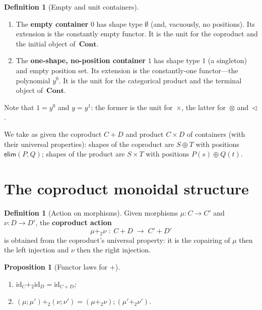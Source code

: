 \documentclass[11pt,a4paper]{article}
\theoremstyle{plain}
\newtheorem{proposition}[theorem]{Proposition}
\theoremstyle{definition}
\newtheorem{definition}[theorem]{Definition}
\newcommand{\id}{\mathrm{id}}
\newcommand{\Cont}{\mathbf{Cont}}
\newcommand{\seq}{\mathbin{\triangleleft}}
\begin{document}
\begin{definition}[Empty and unit containers]\label{def:zero-one}
\begin{enumerate}
  \item The \textbf{empty container} $0$ has shape type $\emptyset$
        (and, vacuously, no positions). Its extension is the constantly
        empty functor. It is the unit for the coproduct and the initial
        object of~$\Cont$.
  \item The \textbf{one-shape, no-position container} $1$ has shape type
        $1$ (a singleton) and empty position set. Its extension is the
        constantly-one functor---the polynomial $y^0$. It is the unit for
        the categorical product and the terminal object of~$\Cont$.
\end{enumerate}
Note that $1 = y^0$ and $y = y^1$: the former is the unit for~$\times$,
the latter for~$\otimes$ and~$\seq$.
\end{definition}

We take as given the coproduct $C + D$ and product $C \times D$ of
containers (with their universal properties): shapes of the coproduct are
$S \oplus T$ with positions $\mathsf{elim}(P,Q)$; shapes of the product
are $S \times T$ with positions $P(s) \oplus Q(t)$.

\section{The coproduct monoidal structure}

\begin{definition}[Action on morphisms]\label{def:coprod2}
Given morphisms $\mu : C \to C'$ and $\nu : D \to D'$, the
\textbf{coproduct action}
\[
  \mu +_2 \nu \;:\; C + D \;\longrightarrow\; C' + D'
\]
is obtained from the coproduct's universal property: it is the copairing
of $\mu$ then the left injection and $\nu$ then the right injection.
\end{definition}

\begin{proposition}[Functor laws for $+$]\label{prop:coprod2-laws}
\begin{enumerate}
  \item $\id_C +_2 \id_D = \id_{C+D}$;
  \item $(\mu \mathbin{;}\mu') +_2 (\nu \mathbin{;}\nu')
        = (\mu +_2 \nu) \mathbin{;} (\mu' +_2 \nu')$.
\end{enumerate}
\end{proposition}
\end{document}

